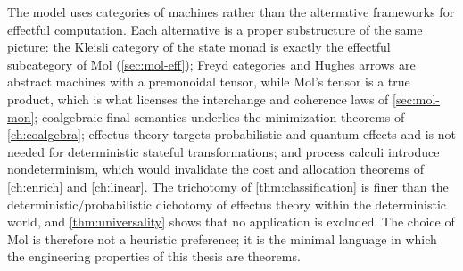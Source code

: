 \begin{remark}
The model uses categories of machines rather than the alternative
frameworks for effectful computation. Each alternative is a proper
substructure of the same picture: the Kleisli category of the state
monad is exactly the effectful subcategory of Mol
(\autoref{sec:mol-eff}); Freyd categories and Hughes arrows are
abstract machines with a premonoidal tensor, while Mol's tensor is a
true product, which is what licenses the interchange and coherence
laws of \autoref{sec:mol-mon}; coalgebraic final semantics underlies
the minimization theorems of \autoref{ch:coalgebra}; effectus theory
targets probabilistic and quantum effects and is not needed for
deterministic stateful transformations; and process calculi
introduce nondeterminism, which would invalidate the cost and
allocation theorems of \autoref{ch:enrich} and \autoref{ch:linear}.
The trichotomy of \autoref{thm:classification} is finer than the
deterministic/probabilistic dichotomy of effectus theory within the
deterministic world, and \autoref{thm:universality} shows that no
application is excluded. The choice of Mol is therefore not a
heuristic preference; it is the minimal language in which the
engineering properties of this thesis are theorems.
\end{remark}
